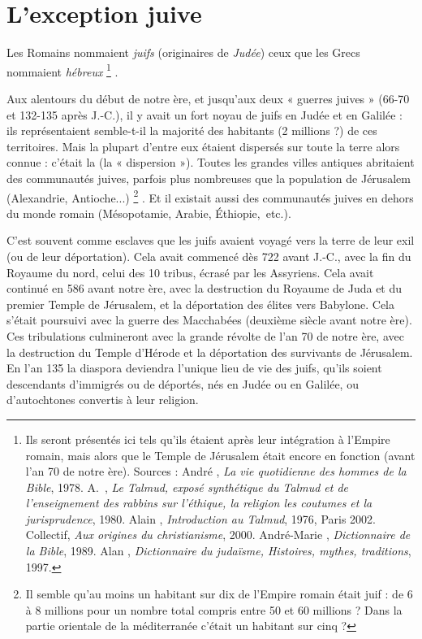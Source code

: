 

\chapter{L'exception juive}

 Les Romains nommaient \emph{juifs} (originaires de \emph{Judée}) ceux que les Grecs nommaient \emph{hébreux}%
\footnote{Ils seront présentés ici tels qu'ils étaient après leur intégration à l'Empire romain, mais alors que le Temple de Jérusalem était encore en fonction (avant l'an 70 de notre ère).
Sources : André , \emph{La vie quotidienne des hommes de la Bible}, 1978. A.~, \emph{Le Talmud, exposé synthétique du Talmud et de l'enseignement des rabbins sur l'éthique, la religion les coutumes et la jurisprudence}, 1980. Alain , \emph{Introduction au Talmud}, 1976, Paris 2002. Collectif, \emph{Aux origines du christianisme}, 2000. André-Marie , \emph{Dictionnaire de la Bible}, 1989. Alan , \emph{Dictionnaire du judaïsme, Histoires, mythes, traditions}, 1997.}%
.

 Aux alentours du début de notre ère, et jusqu'aux deux « guerres juives » (\hbox{66-70} et \hbox{132-135} après J.-C.), il y avait un fort noyau de juifs en Judée et en Galilée : ils représentaient semble-t-il la majorité des habitants (2 millions ?) de ces territoires. Mais la plupart d'entre eux étaient dispersés sur toute la terre alors connue : c'était la  (la « dispersion »). Toutes les grandes villes antiques abritaient des communautés juives, parfois plus nombreuses que la population de Jérusalem (Alexandrie, Antioche...)%
\footnote{Il semble qu'au moins un habitant sur dix de l'Empire romain était juif : de 6 à 8 millions pour un nombre total compris entre 50 et 60 millions ? Dans la partie orientale de la méditerranée c'était un habitant sur cinq ?}%
. Et il existait aussi des communautés juives en dehors du monde romain (Mésopotamie, Arabie, Éthiopie,~etc.).

 C'est souvent comme esclaves que les juifs avaient voyagé vers la terre de leur exil (ou de leur déportation). Cela avait commencé dès 722 avant J.-C., avec la fin du Royaume du nord, celui des 10 tribus, écrasé par les Assyriens. Cela avait continué en 586 avant notre ère, avec la destruction du Royaume de Juda et du premier Temple de Jérusalem, et la déportation des élites vers Babylone. Cela s'était poursuivi avec la guerre des Macchabées (deuxième siècle avant notre ère). Ces tribulations culmineront avec la grande révolte de l'an 70 de notre ère, avec la destruction du Temple d'Hérode et la déportation des survivants de Jérusalem. En l'an 135 la diaspora deviendra l'unique lieu de vie des juifs, qu'ils soient descendants d'immigrés ou de déportés, nés en Judée ou en Galilée, ou d'autochtones convertis à leur religion. 

